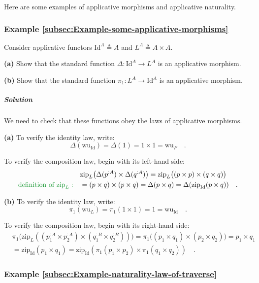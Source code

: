 Here are some examples of applicative morphisms and applicative naturality.

\subsubsection{Example \label{subsec:Example-some-applicative-morphisms}\ref{subsec:Example-some-applicative-morphisms}}

Consider applicative functors $\text{Id}^{A}\triangleq A$ and $L^{A}\triangleq A\times A$. 

\textbf{(a)} Show that the standard function $\Delta:\text{Id}^{A}\rightarrow L^{A}$
is an applicative morphism.

\textbf{(b)} Show that the standard function $\pi_{1}:L^{A}\rightarrow\text{Id}^{A}$
is an applicative morphism. 

\subparagraph{Solution}

We need to check that these functions obey the laws of applicative
morphisms.

\textbf{(a)} To verify the identity law, write:
\[
\Delta(\text{wu}_{\text{Id}})=\Delta(1)=1\times1=\text{wu}_{P}\quad.
\]

To verify the composition law, begin with its left-hand side:
\begin{align*}
 & \text{zip}_{L}\big(\Delta(p^{:A})\times\Delta(q^{:A})\big)=\text{zip}_{L}\big((p\times p)\times(q\times q)\big)\\
{\color{greenunder}\text{definition of }\text{zip}_{L}:}\quad & =(p\times q)\times(p\times q)=\Delta(p\times q)=\Delta(\text{zip}_{\text{Id}}(p\times q))\quad.
\end{align*}

\textbf{(b)} To verify the identity law, write:
\[
\pi_{1}(\text{wu}_{L})=\pi_{1}(1\times1)=1=\text{wu}_{\text{Id}}\quad.
\]

To verify the composition law, begin with its right-hand side:
\begin{align*}
 & \pi_{1}\big(\text{zip}_{L}((p_{1}^{:A}\times p_{2}^{:A})\times(q_{1}^{:B}\times q_{2}^{:B}))\big)=\pi_{1}\big((p_{1}\times q_{1})\times(p_{2}\times q_{2})\big)=p_{1}\times q_{1}\\
 & =\text{zip}_{\text{Id}}(p_{1}\times q_{1})=\text{zip}_{\text{Id}}(\pi_{1}(p_{1}\times p_{2})\times\pi_{1}(q_{1}\times q_{2}))\quad.
\end{align*}


\subsubsection{Example \label{subsec:Example-naturality-law-of-traverse}\ref{subsec:Example-naturality-law-of-traverse}}

